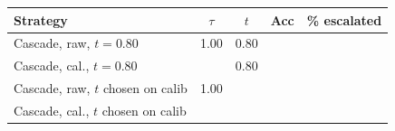 \begin{tabular}{lcccc}
\toprule
\textbf{Strategy} & $\tau$ & $t$ & \textbf{Acc} & \textbf{\% escalated} \\
\midrule
Cascade, raw, $t=0.80$ & 1.00 & 0.80 & \ph{--} & \ph{--} \\
Cascade, cal., $t=0.80$ & \ph{--} & 0.80 & \ph{--} & \ph{--} \\
Cascade, raw, $t$ chosen on calib & 1.00 & \ph{--} & \ph{--} & \ph{--} \\
Cascade, cal., $t$ chosen on calib & \ph{--} & \ph{--} & \ph{--} & \ph{--} \\
\bottomrule
\end{tabular}
